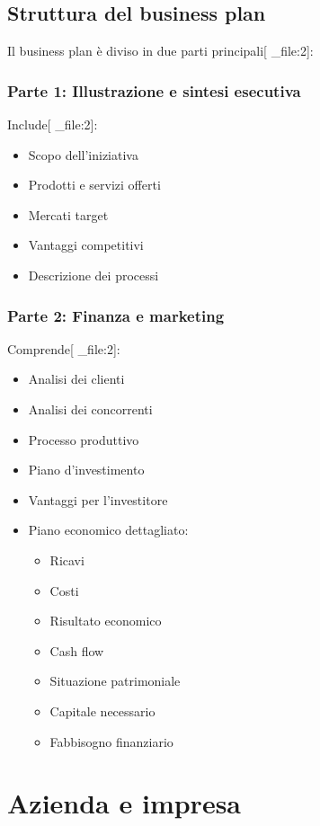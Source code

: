 \documentclass[12pt,a4paper]{article}
\begin{document}
\subsection{Struttura del business plan}
Il business plan è diviso in due parti principali[ _file:2]:

\subsubsection{Parte 1: Illustrazione e sintesi esecutiva}
Include[ _file:2]:
\begin{itemize}
    \item Scopo dell'iniziativa
    \item Prodotti e servizi offerti
    \item Mercati target
    \item Vantaggi competitivi
    \item Descrizione dei processi
\end{itemize}

\subsubsection{Parte 2: Finanza e marketing}
Comprende[ _file:2]:
\begin{itemize}
    \item Analisi dei clienti
    \item Analisi dei concorrenti
    \item Processo produttivo
    \item Piano d'investimento
    \item Vantaggi per l'investitore
    \item Piano economico dettagliato:
    \begin{itemize}
        \item Ricavi
        \item Costi
        \item Risultato economico
        \item Cash flow
        \item Situazione patrimoniale
        \item Capitale necessario
        \item Fabbisogno finanziario
    \end{itemize}
\end{itemize}

\section{Azienda e impresa}
\end{document}

